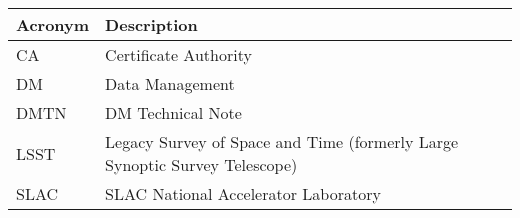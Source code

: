 \addtocounter{table}{-1}
\begin{longtable}{p{}p{}}\hline
\textbf{Acronym} & \textbf{Description}  \\\hline

CA & Certificate Authority \\\hline
DM & Data Management \\\hline
DMTN & DM Technical Note \\\hline
LSST & Legacy Survey of Space and Time (formerly Large Synoptic Survey Telescope) \\\hline
SLAC & SLAC National Accelerator Laboratory \\\hline
\end{longtable}
